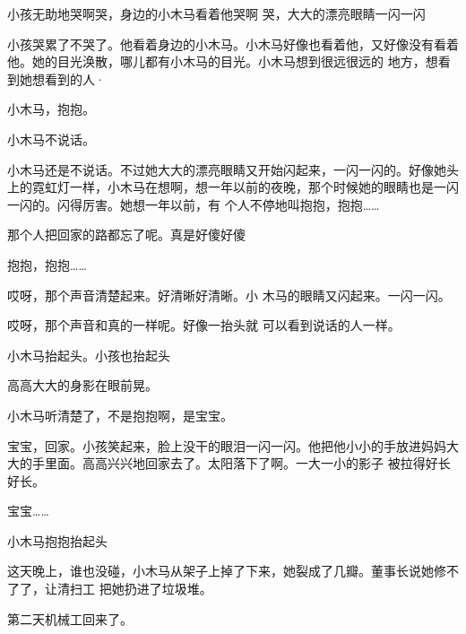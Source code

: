 \documentclass{article}
\begin{document}
小孩无助地哭啊哭，身边的小木马看着他哭啊
哭，大大的漂亮眼睛一闪一闪 

小孩哭累了不哭了。他看着身边的小木马。小木马好像也看着他，又好像没有看着他。她的目光涣散，哪儿都有小木马的目光。小木马想到很远很远的
地方，想看到她想看到的人· 


小木马，抱抱。 

\newpage


小木马不说话。 


小木马还是不说话。不过她大大的漂亮眼睛又开始闪起来，一闪一闪的。好像她头上的霓虹灯一样，小木马在想啊，想一年以前的夜晚，那个时候她的眼睛也是一闪一闪的。闪得厉害。她想一年以前，有
个人不停地叫抱抱，抱抱…… 


那个人把回家的路都忘了呢。真是好傻好傻 


抱抱，抱抱…… 

哎呀，那个声音清楚起来。好清晰好清晰。小
木马的眼睛又闪起来。一闪一闪。 


哎呀，那个声音和真的一样呢。好像一抬头就
可以看到说话的人一样。 


\newpage

小木马抬起头。小孩也抬起头 


高高大大的身影在眼前晃。 


小木马听清楚了，不是抱抱啊，是宝宝。 

宝宝，回家。小孩笑起来，脸上没干的眼泪一闪一闪。他把他小小的手放进妈妈大大的手里面。高高兴兴地回家去了。太阳落下了啊。一大一小的影子
被拉得好长好长。 


宝宝…… 


小木马抱抱抬起头 

这天晚上，谁也没碰，小木马从架子上掉了下来，她裂成了几瓣。董事长说她修不了了，让清扫工
把她扔进了垃圾堆。 

第二天机械工回来了。
\end{document}
